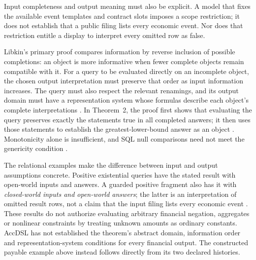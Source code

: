 Input completeness and output meaning must also be explicit. A model that
fixes the available event templates and contract slots imposes a scope
restriction; it does not establish that a public filing lists every economic
event. Nor does that restriction entitle a display to interpret every omitted
row as false.

Libkin's primary proof compares information by reverse inclusion of possible
completions: an object is more informative when fewer complete objects remain
compatible with it. For a query to be evaluated directly on an incomplete
object, the chosen output interpretation must preserve that order as input
information increases. The query must also respect the relevant renamings,
and its output domain must have a representation system whose formulas
describe each object's complete interpretations
\citep[Sections~6.1--6.2, equations~(9)--(10)]{libkin2014}. In Theorem~2, the proof
first shows that evaluating the query preserves exactly the statements true
in all completed answers; it then uses those statements to establish the
greatest-lower-bound answer as an object
\citep[Definitions~4--7 and Theorem~2, pp.~11--18]{libkin2016certain}.
Monotonicity alone is insufficient, and SQL null comparisons need not meet
the genericity condition \citep[Section~7.1, pp.~18--19]{libkin2016certain}.

The relational examples make the difference between input and output
assumptions concrete. Positive existential queries have the stated result
with open-world inputs and answers. A guarded positive fragment also has it
with \emph{closed-world inputs and open-world answers}; the latter is an
interpretation of omitted result rows, not a claim that the input filing
lists every economic event
\citep[Proposition~9 and Corollary~3, p.~20]{libkin2016certain}.
These results do not authorize evaluating arbitrary financial negation,
aggregates or nonlinear constraints by treating unknown amounts as ordinary
constants. AccDSL has not established the theorem's abstract domain,
information order and representation-system conditions for every financial
output. The constructed payable example above instead follows directly
from its two declared histories.

